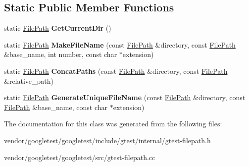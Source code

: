 \subsection*{Static Public Member Functions}
\begin{DoxyCompactItemize}
\item 
\mbox{\label{classtesting_1_1internal_1_1_file_path_aaff39ccd7bfb7a1c09c0220a64326387}} 
static \hyperlink{classtesting_1_1internal_1_1_file_path}{File\+Path} {\bfseries Get\+Current\+Dir} ()
\item 
\mbox{\label{classtesting_1_1internal_1_1_file_path_aa8c102da670261eb4fa8e2f2481df139}} 
static \hyperlink{classtesting_1_1internal_1_1_file_path}{File\+Path} {\bfseries Make\+File\+Name} (const \hyperlink{classtesting_1_1internal_1_1_file_path}{File\+Path} \&directory, const \hyperlink{classtesting_1_1internal_1_1_file_path}{File\+Path} \&base\+\_\+name, int number, const char $\ast$extension)
\item 
\mbox{\label{classtesting_1_1internal_1_1_file_path_ac9d57987f60ac43f0c57b89e333e531e}} 
static \hyperlink{classtesting_1_1internal_1_1_file_path}{File\+Path} {\bfseries Concat\+Paths} (const \hyperlink{classtesting_1_1internal_1_1_file_path}{File\+Path} \&directory, const \hyperlink{classtesting_1_1internal_1_1_file_path}{File\+Path} \&relative\+\_\+path)
\item 
\mbox{\label{classtesting_1_1internal_1_1_file_path_a2280a77adb394cf80bb5f73fc292e8c8}} 
static \hyperlink{classtesting_1_1internal_1_1_file_path}{File\+Path} {\bfseries Generate\+Unique\+File\+Name} (const \hyperlink{classtesting_1_1internal_1_1_file_path}{File\+Path} \&directory, const \hyperlink{classtesting_1_1internal_1_1_file_path}{File\+Path} \&base\+\_\+name, const char $\ast$extension)
\end{DoxyCompactItemize}


The documentation for this class was generated from the following files\+:\begin{DoxyCompactItemize}
\item 
vendor/googletest/googletest/include/gtest/internal/gtest-\/filepath.\+h\item 
vendor/googletest/googletest/src/gtest-\/filepath.\+cc\end{DoxyCompactItemize}
